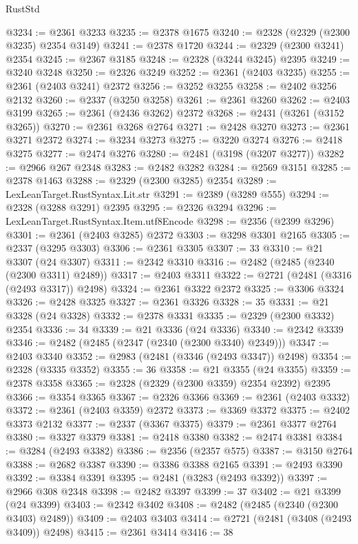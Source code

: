 \begin{lexlean}{RustStd}
\begin{coremodule}
@3234 := @2361 @3233
@3235 := @2378 @1675
@3240 := @2328 (@2329 (@2300 @3235) @2354 @3149)
@3241 := @2378 @1720
@3244 := @2329 (@2300 @3241) @2354
@3245 := @2367 @3185
@3248 := @2328 (@3244 @3245) @2395
@3249 := @3240 @3248
@3250 := @2326 @3249
@3252 := @2361 (@2403 @3235)
@3255 := @2361 (@2403 @3241) @2372
@3256 := @3252 @3255
@3258 := @2402 @3256 @2132
@3260 := @2337 (@3250 @3258)
@3261 := @2361 @3260
@3262 := @2403 @3199
@3265 := @2361 (@2436 @3262) @2372
@3268 := @2431 (@3261 (@3152 @3265))
@3270 := @2361 @3268 @2764
@3271 := @2428 @3270
@3273 := @2361 @3271 @2372
@3274 := @3234 @3273
@3275 := @3220 @3274
@3276 := @2418 @3275
@3277 := @2474 @3276
@3280 := @2481 (@3198 (@3207 @3277))
@3282 := @2966 @267 @2348
@3283 := @2482 @3282
@3284 := @2569 @3151
@3285 := @2378 @1463
@3288 := @2329 (@2300 @3285) @2354
@3289 := LexLeanTarget.RustSyntax.Lit.str
@3291 := @2389 (@3289 @555)
@3294 := @2328 (@3288 @3291) @2395
@3295 := @2326 @3294
@3296 := LexLeanTarget.RustSyntax.Item.utf8Encode
@3298 := @2356 (@2399 @3296)
@3301 := @2361 (@2403 @3285) @2372
@3303 := @3298 @3301 @2165
@3305 := @2337 (@3295 @3303)
@3306 := @2361 @3305
@3307 := 33
@3310 := @21 @3307 (@24 @3307)
@3311 := @2342 @3310
@3316 := @2482 (@2485 (@2340 (@2300 @3311) @2489))
@3317 := @2403 @3311
@3322 := @2721 (@2481 (@3316 (@2493 @3317)) @2498)
@3324 := @2361 @3322 @2372
@3325 := @3306 @3324
@3326 := @2428 @3325
@3327 := @2361 @3326
@3328 := 35
@3331 := @21 @3328 (@24 @3328)
@3332 := @2378 @3331
@3335 := @2329 (@2300 @3332) @2354
@3336 := 34
@3339 := @21 @3336 (@24 @3336)
@3340 := @2342 @3339
@3346 := @2482 (@2485 (@2347 (@2340 (@2300 @3340) @2349)))
@3347 := @2403 @3340
@3352 := @2983 (@2481 (@3346 (@2493 @3347)) @2498)
@3354 := @2328 (@3335 @3352)
@3355 := 36
@3358 := @21 @3355 (@24 @3355)
@3359 := @2378 @3358
@3365 := @2328 (@2329 (@2300 @3359) @2354 @2392) @2395
@3366 := @3354 @3365
@3367 := @2326 @3366
@3369 := @2361 (@2403 @3332)
@3372 := @2361 (@2403 @3359) @2372
@3373 := @3369 @3372
@3375 := @2402 @3373 @2132
@3377 := @2337 (@3367 @3375)
@3379 := @2361 @3377 @2764
@3380 := @3327 @3379
@3381 := @2418 @3380
@3382 := @2474 @3381
@3384 := @3284 (@2493 @3382)
@3386 := @2356 (@2357 @575)
@3387 := @3150 @2764
@3388 := @2682 @3387
@3390 := @3386 @3388 @2165
@3391 := @2493 @3390
@3392 := @3384 @3391
@3395 := @2481 (@3283 (@2493 @3392))
@3397 := @2966 @308 @2348
@3398 := @2482 @3397
@3399 := 37
@3402 := @21 @3399 (@24 @3399)
@3403 := @2342 @3402
@3408 := @2482 (@2485 (@2340 (@2300 @3403) @2489))
@3409 := @2403 @3403
@3414 := @2721 (@2481 (@3408 (@2493 @3409)) @2498)
@3415 := @2361 @3414
@3416 := 38

\end{coremodule}
\end{lexlean}
